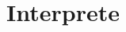 \documentclass[../main.tex]{subfiles}
\begin{document}
\chapter{Interprete}\label{c:interprete}
\end{document}
